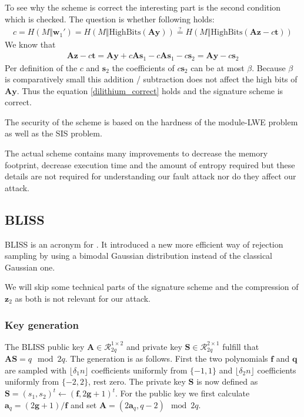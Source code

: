 \documentclass[a4paper,titlepage]{article}
\begin{document}
To see why the scheme is correct the interesting part is the second condition which is checked. The question is whether following holds:
\begin{align}
\label{dilithium_correct}
	c = H(M \Vert \bm{w}_1') = H(M \Vert \text{HighBits}(\bm{A}\bm{y}))  \overset{?}{=}  H(M \Vert \text{HighBits}(\bm{A} \bm{z} - c \bm{t}))
\end{align}
We know that
\begin{align}
	\bm{A} \bm{z} - c \bm{t} = \bm{A}\bm{y}+c\bm{A}\bm{s}_1 - c\bm{A}\bm{s}_1 - c \bm{s}_2 = \bm{A}\bm{y}- c \bm{s}_2
\end{align}
Per definition of the $c$ and $\bm{s}_2$ the coefficients of  $c \bm{s}_2$ can be at most $β$. Because $β$ is comparatively small this addition / subtraction does not affect the high bits of  $\bm{A}\bm{y}$. Thus the equation \eqref{dilithium_correct} holds and the signature scheme is correct.

The security of the scheme is based on the hardness of the module-LWE problem as well as the SIS problem.

The actual scheme contains many improvements to decrease the memory footprint, decrease execution time and the amount of entropy required but these details are not required for understanding our fault attack nor do they affect our attack.



\subsection{BLISS}
\label{sec:blissdesc}
BLISS \cite{bliss}  is an acronym for . It introduced a new more efficient way of rejection sampling by using a bimodal Gaussian distribution instead of the classical Gaussian one.

We will skip some technical parts of the signature scheme and the compression of $\bm{z}_{2}$ as both is not relevant for our attack.

\subsubsection{Key generation}
\label{sec:blisskeygen}
The BLISS public key $\bm{A} \in \mathcal{R}_{2q}^{1 \times 2}$ and private key $\bm{S} \in \mathcal{R}_{2q}^{2 \times 1}$ fulfill that $\bm{A}\bm{S} = q \mod 2q$. The generation is as follows.
First the two polynomials $\bm{f}$ and $\bm{q}$ are sampled with $\lfloor \delta_{1} n \rfloor$ coefficients uniformly from $\{-1, 1\}$ and   $\lfloor \delta_{2} n \rfloor$ coefficients uniformly from $\{-2, 2\}$, rest zero.
The private key $\bm{S}$ is now defined as $\bm{S} = (s_{1}, s_{2})^{t} \leftarrow (\bm{f}, 2\bm{g}+1)^{t}$.
For the public key we first calculate $\bm{a}_{q} = (2 \bm{g} + 1) / \bm{f}$ and set $\bm{A} = (2 \bm{a}_{q}, q - 2) \mod 2q$.
\end{document}

